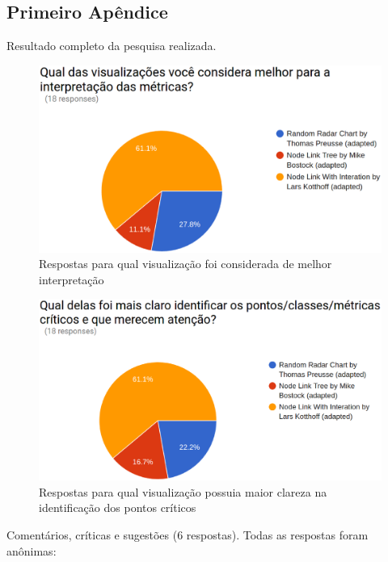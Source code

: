 \begin{apendicesenv}

\partapendices

\chapter{Primeiro Apêndice}
\label{chap:apendiceA}

Resultado completo da pesquisa realizada.

\begin{figure}[!htb]
	\centering
    \includegraphics[keepaspectratio=true,scale=0.35]
    {figuras/res1.eps}
  \caption{Respostas para qual visualização foi considerada de melhor
  interpretação}
  \label{fig:res1}
\end{figure}

\begin{figure}[!htb]
	\centering
    \includegraphics[keepaspectratio=true,scale=0.35]
    {figuras/res2.eps}
  \caption{Respostas para qual visualização possuia maior clareza na
  identificação dos pontos críticos}
  \label{fig:res2}
\end{figure}

Comentários, críticas e sugestões (6 respostas). Todas as respostas foram
anônimas:


\end{apendicesenv}
